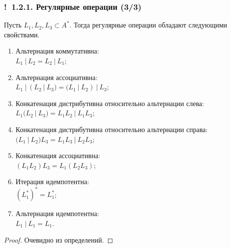 \documentclass[mathserif,12pt,aspectratio=169]{beamer}
\def\Ok{{\color{green}\textbf{!}\ }}
\begin{document}
\begin{frame}
\frametitle{\Ok 1.2.1. Регулярные операции (3/3)}
\begin{theorem}
Пусть $L_1, L_2, L_3\subset A^*$. Тогда регулярные операции
обладают следующими свойствами.
\begin{enumerate}
  \item Альтернация коммутативна:\\[-2pt]
  $L_1~|~ L_2 = L_2~|~ L_1$;\\[-1pt]
  \item Альтернация ассоциативна:\\[-2pt]
  $L_1~|~ (L_2~|~ L_3) = (L_1~|~ L_2)~|~L_3$;\\[-1pt]
  \item Конкатенация дистрибутивна относительно альтернации слева:\\[-2pt]
  $L_1(L_2~|~ L_3) = L_1 L_2~|~ L_1 L_3$;\\[-1pt]
  \item Конкатенация дистрибутивна относительно альтернации справа:\\[-2pt]
$(L_1~|~ L_2)L_3 = L_1 L_3~|~ L_2 L_3$;\\[-1pt]
  \item Конкатенация ассоциативна:\\[-2pt]
  $(L_1 L_2)L_3 = L_1(L_2 L_3)$;\\[-1pt]
    \item Итерация идемпотентна:\\[-2pt]
  $(L_1^*)^* = L_1^*$;\\[-1pt]
      \item Альтернация идемпотентна:\\[-2pt]
  $L_1~|~L_1 = L_1$.\\[-1pt]
\end{enumerate}
\end{theorem}
\begin{proof}
Очевидно из определений.
\end{proof}
\end{frame}
\end{document}
